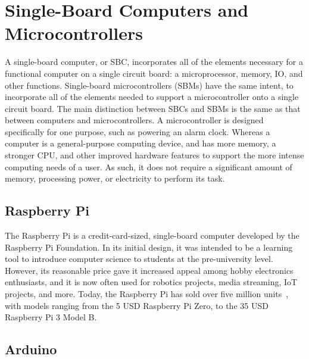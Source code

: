 \documentclass[12pt]{report}
\let\Oldsection\section
\renewcommand{\section}{\FloatBarrier\Oldsection}
\let\Oldsubsection\subsection
\renewcommand{\subsection}{\FloatBarrier\Oldsubsection}
\begin{document}

\section{Single-Board Computers and Microcontrollers} \label{single-board-computers-and-microcontrollers}

A single-board computer, or SBC, incorporates all of the elements necessary for a functional 
computer on a single circuit board: a microprocessor, memory, IO, and other functions. Single-board microcontrollers
(SBMs) have the same intent, to incorporate all of the elements needed to support a microcontroller onto a single
circuit board. The main distinction between SBCs and SBMs is the same as that between computers and microcontrollers.
A microcontroller is designed specifically for one  purpose, such as powering an alarm clock. Whereas a
computer is a general-purpose computing device, and has more memory, a stronger CPU, and other improved hardware 
features to support the more intense computing needs of a user. As such, it does not require a significant amount of
memory, processing power, or electricity to perform its task.


\subsection{Raspberry Pi} \label{raspberry-pi}


The Raspberry Pi is a credit-card-sized, single-board computer developed by the Raspberry Pi Foundation. In its initial 
design, it was intended to be a learning tool to introduce computer science to students at the pre-university  
level. However, its reasonable price gave it increased appeal among hobby electronics enthusiasts, and it is now often 
used for robotics projects, media streaming, IoT projects, and more. Today, the Raspberry Pi has sold over five million 
units~\autocite{RPISALES}, with models ranging from the 5 USD Raspberry Pi Zero, to the 35 USD Raspberry Pi 3 Model B.


\subsection{Arduino} \label{arduino}
\end{document}
